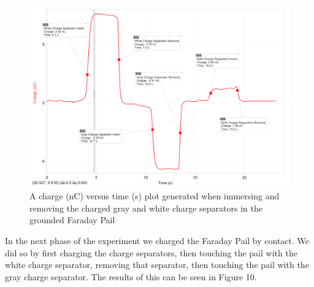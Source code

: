 \documentclass[12pt]{amsart}
\begin{document}
\begin{figure}[h]
	\includegraphics[width=\medgraph,scale=0.01]{SeparatorsBor.png}
	\caption{A charge (nC) versus time (s) plot generated when immersing and removing the charged gray and white charge separators in the grounded Faraday Pail}
	\label{BOr}
\end{figure} 
\indent In the next phase of the experiment we charged the Faraday Pail by contact. We did so by first charging the charge separators, then touching the pail with the white charge separator, removing that separator, then touching the pail with the gray charge separator. The results of this can be seen in Figure 10.\\
\end{document}
